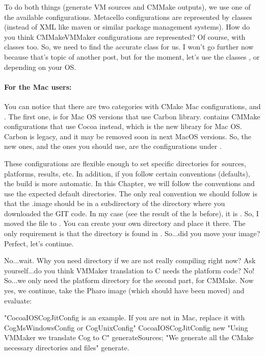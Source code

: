 \documentclass[a4paper,10pt,twoside]{book}
\begin{document}
To do both things (generate VM sources and CMMake outputs), we use one of the available  configurations. Metacello configurations are represented by classes (instead of XML like maven or similar package management systems). How do you think CMMakeVMMaker configurations are represented? Of course, with classes too. So, we need to find the accurate class for us. I won't go further now because that's topic of another post, but for the moment, let's use the classes ,  or  depending on your OS.

\paragraph{For the Mac users:}
You can notice that there are two categories with CMake Mac configurations,  and . The first one, is for Mac OS versions that use Carbon library.  contains CMMake configurations that use Cocoa instead, which is the new library for Mac OS. Carbon is legacy, and it may be removed soon in next MacOS versions. So, the new ones, and the ones you should use, are the configurations under .

These configurations are flexible enough to set specific directories for sources, platforms, results, etc. In addition, if you follow certain conventions (defaults), the build is more automatic. In this Chapter, we will follow the conventions and use the expected default directories. The only real convention we should follow is that the .image should be in a subdirectory of the directory where you downloaded the GIT code. In my case (see the result of the ls before), it is .  So, I moved the  file to . You can create your own directory    and place it there. The only requirement is that the  directory is found in .  So...did you move your image?   Perfect, let's continue.

No...wait. Why you need  directory if we are not really compiling right now?  Ask yourself...do you think VMMaker translation to C needs the platform code?  No! So...we only need the platform directory for the second part, \ie for CMMake. Now yes, we continue, take the Pharo image (which should have been moved) and evaluate:

\begin{code}{}
"CocoaIOSCogJitConfig is an example. If you are not in Mac, replace it with CogMsWindowsConfig or CogUnixConfig"
CocoaIOSCogJitConfig  new
	"Using VMMaker we translate Cog to C"
	generateSources;
	"We generate all the CMake necessary directories and files"
	generate.
\end{code}
\end{document}
